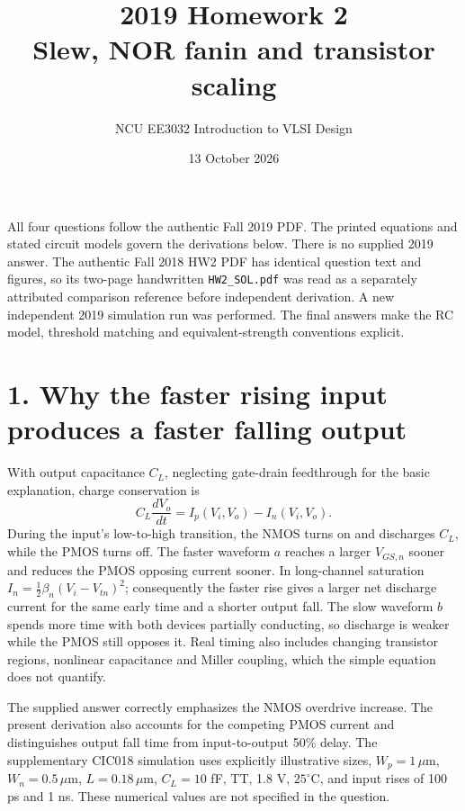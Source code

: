\documentclass[11pt,a4paper]{article}
\title{2019 Homework 2\\Slew, NOR fanin and transistor scaling}
\author{NCU EE3032 Introduction to VLSI Design}\date{13 October 2026}
\newcommand{\VDD}{V_{\mathrm{DD}}}
\begin{document}
\maketitle
All four questions follow the authentic Fall 2019 PDF. The printed equations
and stated circuit models govern the derivations below. There is no
supplied 2019 answer. The authentic Fall 2018 HW2 PDF has identical question
text and figures, so its two-page handwritten \texttt{HW2\_SOL.pdf} was read
as a separately attributed comparison reference before independent derivation.
A new independent 2019 simulation run was performed.
The final answers make the RC model, threshold matching and
equivalent-strength conventions explicit.

\section*{1. Why the faster rising input produces a faster falling output}
With output capacitance $C_L$, neglecting gate-drain feedthrough for the
basic explanation, charge conservation is
\[
 C_L\frac{dV_o}{dt}=I_p(V_i,V_o)-I_n(V_i,V_o).
\]
During the input's low-to-high transition, the NMOS turns on and discharges
$C_L$, while the PMOS turns off. The faster waveform $a$ reaches a larger
$V_{GS,n}$ sooner and reduces the PMOS opposing current sooner.
In long-channel saturation $I_n=\frac12\beta_n(V_i-V_{tn})^2$; consequently
the faster rise gives a larger net discharge current for the same early time
and a shorter output fall. The slow waveform $b$ spends more time with both
devices partially conducting, so discharge is weaker while the PMOS still
opposes it. Real timing also includes changing transistor regions, nonlinear
capacitance and Miller coupling, which the simple equation does not quantify.

\begin{center}\end{center}
The supplied answer correctly emphasizes the NMOS overdrive increase.
The present derivation also accounts for the competing PMOS current and
distinguishes output fall time from input-to-output 50\% delay.
The supplementary CIC018 simulation uses explicitly illustrative sizes,
$W_p=1\,\mu$m, $W_n=0.5\,\mu$m, $L=0.18\,\mu$m, $C_L=10$ fF,
TT, 1.8 V, $25^\circ$C, and input rises of 100 ps and 1 ns.
These numerical values are not specified in the question.
\end{document}

